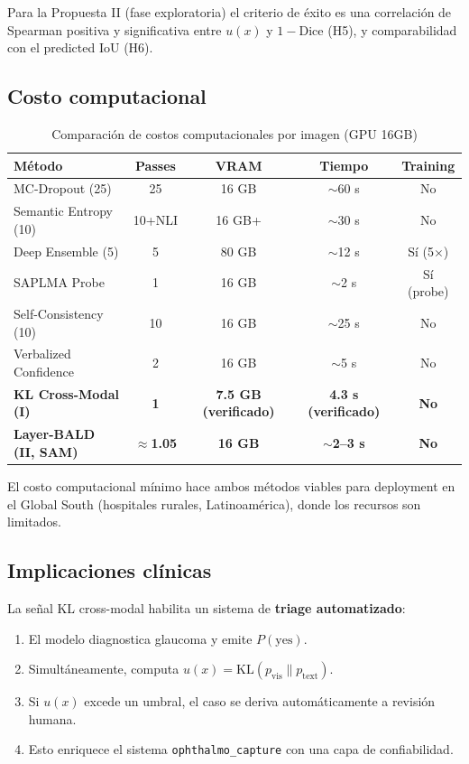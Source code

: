 \documentclass[12pt,a4paper]{article}
\newcommand{\KL}{\mathrm{KL}}
\begin{document}
Para la Propuesta II (fase exploratoria) el criterio de éxito es una correlación de Spearman positiva y significativa entre $u(x)$ y $1-\mathrm{Dice}$ (H5), y comparabilidad con el predicted IoU (H6).

\subsection{Costo computacional}

\begin{table}[H]
\centering
\caption{Comparación de costos computacionales por imagen (GPU 16GB)}
\label{tab:costos}
\begin{tabular}{lcccc}
\toprule
\textbf{Método} & \textbf{Passes} & \textbf{VRAM} & \textbf{Tiempo} & \textbf{Training} \\
\midrule
MC-Dropout (25) & 25 & 16 GB & $\sim$60 s & No \\
Semantic Entropy (10) & 10+NLI & 16 GB+ & $\sim$30 s & No \\
Deep Ensemble (5) & 5 & 80 GB & $\sim$12 s & Sí (5$\times$) \\
SAPLMA Probe & 1 & 16 GB & $\sim$2 s & Sí (probe) \\
Self-Consistency (10) & 10 & 16 GB & $\sim$25 s & No \\
Verbalized Confidence & 2 & 16 GB & $\sim$5 s & No \\
\midrule
\textbf{KL Cross-Modal (I)} & \textbf{1} & \textbf{7.5 GB (verificado)} & \textbf{4.3 s (verificado)} & \textbf{No} \\
\textbf{Layer-BALD (II, SAM)} & \textbf{$\approx$1.05} & \textbf{16 GB} & \textbf{$\sim$2--3 s} & \textbf{No} \\
\bottomrule
\end{tabular}
\end{table}

El costo computacional mínimo hace ambos métodos viables para deployment en el Global South (hospitales rurales, Latinoamérica), donde los recursos son limitados.

\subsection{Implicaciones clínicas}

La señal KL cross-modal habilita un sistema de \textbf{triage automatizado}:

\begin{enumerate}
    \item El modelo diagnostica glaucoma y emite $P(\text{yes})$.
    \item Simultáneamente, computa $u(x) = \KL(p_{\text{vis}} \| p_{\text{text}})$.
    \item Si $u(x)$ excede un umbral, el caso se deriva automáticamente a revisión humana.
    \item Esto enriquece el sistema \texttt{ophthalmo\_capture} con una capa de confiabilidad.
\end{enumerate}
\end{document}
